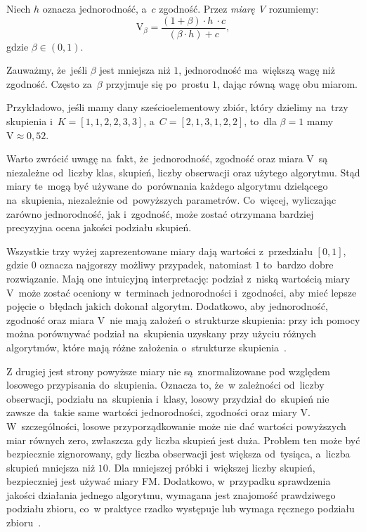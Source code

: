 \documentclass{praca1}
\begin{document}
\begin{definition}
Niech $h$ oznacza jednorodność, a~$c$ zgodność. Przez \emph{miarę V} rozumiemy:
\begin{equation}
\textrm{V}_{\beta} = \frac{(1+\beta)\cdot h~\cdot c}{(\beta \cdot h) + c},
\end{equation}
gdzie $\beta \in (0,1)$.
\end{definition}

Zauważmy, że~jeśli $\beta$ jest mniejsza niż $1$, jednorodność ma~większą wagę niż zgodność. Często za~$\beta$ przyjmuje się po~prostu $1$, dając równą wagę obu miarom.

Przykładowo, jeśli mamy dany sześcioelementowy zbiór, który dzielimy na~trzy skupienia i~$K = [1, 1, 2, 2, 3, 3]$, a~$C = [2, 1, 3, 1, 2, 2]$, to~dla $\beta = 1$ mamy $\textrm{V} \approx 0,52$.

Warto zwrócić uwagę na~fakt, że~jednorodność, zgodność oraz miara V~są niezależne od~liczby klas, skupień, liczby obserwacji oraz użytego algorytmu. Stąd miary te~mogą być używane do~porównania każdego algorytmu dzielącego na~skupienia, niezależnie od~powyższych parametrów. Co~więcej, wyliczając zarówno jednorodność, jak i~zgodność, może zostać otrzymana bardziej precyzyjna ocena jakości podziału skupień.


Wszystkie trzy wyżej zaprezentowane miary dają wartości z~przedziału $[0, 1]$, gdzie $0$ oznacza najgorszy możliwy przypadek, natomiast $1$ to~bardzo dobre rozwiązanie. Mają one intuicyjną interpretację: podział z~niską wartością miary V~może zostać oceniony w~terminach jednorodności i~zgodności, aby mieć lepsze pojęcie o~błędach jakich dokonał algorytm. Dodatkowo, aby jednorodność, zgodność oraz miara V~nie mają założeń o~strukturze skupienia: przy ich pomocy można porównywać podział na~skupienia uzyskany przy użyciu różnych algorytmów, które mają różne założenia o~strukturze skupienia~\cite{scikit}. 

Z drugiej jest strony powyższe miary nie są~znormalizowane pod względem losowego przypisania do~skupienia. Oznacza to, że~w zależności od~liczby obserwacji, podziału na~skupienia i~klasy, losowy przydział do~skupień nie zawsze da~takie same wartości jednorodności, zgodności oraz miary V. W~szczególności, losowe przyporządkowanie może nie dać wartości powyższych miar równych zero, zwłaszcza gdy liczba skupień jest duża. Problem ten może być bezpiecznie zignorowany, gdy liczba obserwacji jest większa od~tysiąca, a~liczba skupień mniejsza niż $10$. Dla mniejszej próbki i~większej liczby skupień, bezpieczniej jest używać miary FM.
Dodatkowo, w~przypadku sprawdzenia jakości działania jednego algorytmu, wymagana jest znajomość prawdziwego podziału zbioru, co~w praktyce rzadko występuje lub wymaga ręcznego podziału zbioru~\cite{scikit}.
\end{document}
